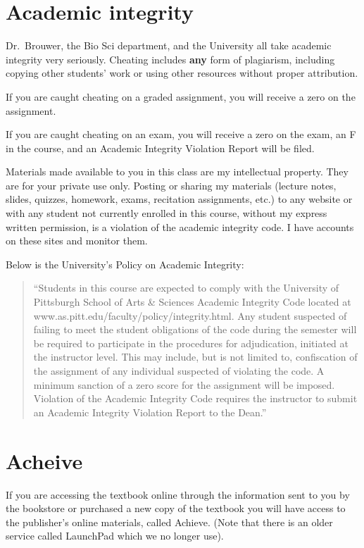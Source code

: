 \documentclass[
]{book}
\begin{document}
\hypertarget{academic-integrity}{%
\chapter{Academic integrity}\label{academic-integrity}}

Dr.~Brouwer, the Bio Sci department, and the University all take academic integrity very seriously. Cheating includes \textbf{any} form of plagiarism, including copying other students' work or using other resources without proper attribution.

If you are caught cheating on a graded assignment, you will receive a zero on the assignment.

If you are caught cheating on an exam, you will receive a zero on the exam, an F in the course, and an Academic Integrity Violation Report will be filed.

Materials made available to you in this class are my intellectual property. They are for your private use only. Posting or sharing my materials (lecture notes, slides, quizzes, homework, exams, recitation assignments, etc.) to any website or with any student not currently enrolled in this course, without my express written permission, is a violation of the academic integrity code. I have accounts on these sites and monitor them.

Below is the University's Policy on Academic Integrity:

\begin{quote}
``Students in this course are expected to comply with the University of Pittsburgh School of Arts \& Sciences Academic Integrity Code located at www.as.pitt.edu/faculty/policy/integrity.html. Any student suspected of failing to meet the student obligations of the code during the semester will be required to participate in the procedures for adjudication, initiated at the instructor level. This may include, but is not limited to, confiscation of the assignment of any individual suspected of violating the code. A minimum sanction of a zero score for the assignment will be imposed. Violation of the Academic Integrity Code requires the instructor to submit an Academic Integrity Violation Report to the Dean.''
\end{quote}

\hypertarget{acheive}{%
\chapter{Acheive}\label{acheive}}

If you are accessing the textbook online through the information sent to you by the bookstore or purchased a new copy of the textbook you will have access to the publisher's online materials, called Achieve. (Note that there is an older service called LaunchPad which we no longer use).
\end{document}
